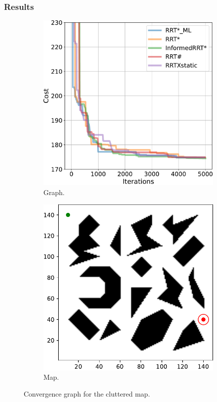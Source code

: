 \documentclass{beamer}
\begin{document}

\begin{frame}
	\frametitle{Results}	
	\begin{figure}[!ht]
		\centering 
		\begin{subfigure}[b]{0.48\textwidth}
		  \includegraphics[width=\textwidth]{figChap5/graph_clutter_20pt_ticks.pdf}  
		  \caption{Graph.} 
		\end{subfigure}
		\begin{subfigure}[b]{0.49\textwidth}
			\includegraphics[width=\textwidth]{figChap5/Maze_clutter_ticks.pdf}
			\caption{Map.} 
		\end{subfigure}   
		\caption{Convergence graph for the cluttered map.} 
	\end{figure}
\end{frame}	
\end{document}
